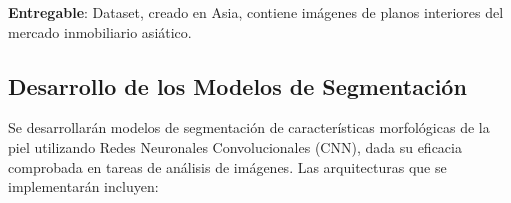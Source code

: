 \textbf{Entregable}: Dataset, creado en Asia, contiene imágenes de planos interiores del mercado inmobiliario asiático.





\subsection{Desarrollo de los Modelos de Segmentación}
Se desarrollarán modelos de segmentación de características morfológicas de la piel utilizando Redes Neuronales Convolucionales (CNN), dada su eficacia comprobada en tareas de análisis de imágenes. Las arquitecturas que se implementarán incluyen:

